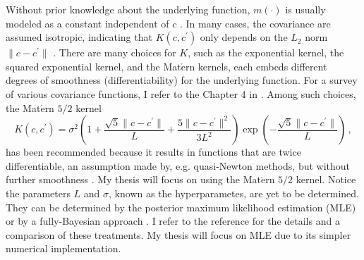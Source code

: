 Without prior knowledge about the underlying function,
$m(\cdot)$ is usually modeled as a constant independent of $c$ \cite{GP book}.
In many cases, the covariance are assumed isotropic, indicating that $K(c,c^\prime)$ only depends
on the $L_2$ norm $\|c-c^\prime\|$ \cite{GP book}.
There are many choices for $K$, such as the exponential kernel, the squared
exponential kernel, and the Mat$\acute{\textrm{e}}$rn kernels, each embeds 
different degrees of smoothness (differentiability) for the underlying function. For a survey of
various covariance functions, I refer to the Chapter 4 in \cite{GP book}.
Among such choices, the Mat$\acute{\textrm{e}}$rn $5/2$ kernel \cite{Matern kernel}
\begin{equation}
    K(c, c^\prime) = 
    \sigma^2 \left(1+\frac{\sqrt{5} \|c-c^\prime\|}{L}
    + \frac{5\|c-c^\prime\|^2}{3 L^2}\right) \exp\left(-\frac{\sqrt{5}\|c-c^\prime\|}{L}\right)\,,
    \label{eqn: Matern kernel}
\end{equation}
has been recommended because it results in functions that are
twice differentiable, an assumption made by, e.g. quasi-Newton methods, but without further
smoothness \cite{practical Bayesian}. 
My thesis will focus on using the Mat$\acute{\textrm{e}}$rn $5/2$ kernel. 
Notice the parameters $L$ and $\sigma$, known as the hyperparametes, are yet to be determined. 
They can be determined by the posterior maximum likelihood estimation (MLE) or by a
fully-Bayesian approach \cite{practical Bayesian, jones1998}. 
I refer to the reference \cite{practical Bayesian} for the details 
and a comparison of these treatments. 
My thesis will focus on MLE due to its simpler numerical implementation.
\\


